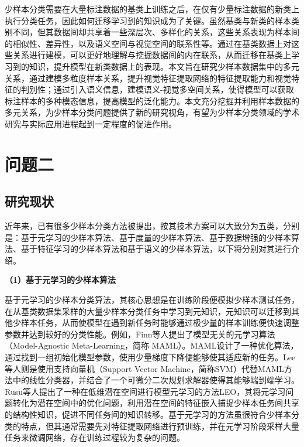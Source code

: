 少样本分类需要在大量标注数据的基类上训练之后，在仅有少量标注数据的新类上执行分类任务，因此如何迁移学习到的知识成为了关键。虽然基类与新类的样本类别不同，但其数据间却共享着一些深层次、多样化的关系，这些关系表现为样本间的相似性、差异性，以及语义空间与视觉空间的联系性等。通过在基类数据上对这些关系进行建模，可以更好地理解与挖掘数据间的内在联系，从而迁移在基类上学习到的知识，提升模型在新类数据上的表现。本文旨在研究少样本数据集中的多元关系，通过建模多粒度样本关系，提升视觉特征提取网络的特征提取能力和视觉特征的判别性；通过引入语义信息，建模语义-视觉多空间关系，使得模型可以获取标注样本的多种模态信息，提高模型的泛化能力。本文充分挖掘并利用样本数据的多元关系，为少样本分类问题提供了新的研究视角，有望为少样本分类领域的学术研究与实际应用进程起到一定程度的促进作用。


\section[\hspace{-2pt}问题二]{{\heiti{} \hspace{-8pt}问题二}}\label{section1: 问题二}

\subsection[\hspace{-2pt}研究现状]{{\heiti{} \hspace{-8pt}研究现状}}\label{section1: 研究现状}

近年来，已有很多少样本分类方法被提出，按其技术方案可以大致分为五类，分别是：基于元学习的少样本算法、基于度量的少样本算法、基于数据增强的少样本算法、基于特征学习的少样本算法和基于语义的少样本算法，以下将分别对其进行介绍。

\textbf{（1）基于元学习的少样本算法}

基于元学习的少样本分类算法\cite{MAML, lee2019meta, LEO, 元学习}，其核心思想是在训练阶段便模拟少样本测试任务，在从基类数据集采样的大量少样本分类任务中学习到元知识，元知识可以迁移到其他少样本任务，从而使模型在遇到新任务时能够通过极少量的样本训练便快速调整参数并达到较好的分类性能。例如，Finn等人\cite{MAML}提出了模型无关的元学习算法（Model-Agnostic Meta-Learning，简称 MAML）。MAML设计了一种优化算法，通过找到一组初始化模型参数，使用少量梯度下降便能够使其适应新的任务。Lee等人\cite{lee2019meta}则是使用支持向量机（Support Vector Machine，简称SVM）代替MAML方法中的线性分类器，并结合了一个可微分二次规划求解器使得其能够端到端学习。Rusu等人\cite{LEO}提出了一种在低维潜在空间进行模型元学习的方法LEO，其将元学习问题转化为潜在空间中的优化问题，利用潜在空间的特征嵌入捕捉少样本任务间共享的结构性知识，促进不同任务间的知识转移。基于元学习的方法虽很符合少样本分类的特点，但其通常需要先对特征提取网络进行预训练，并在元学习阶段采样大量任务来微调网络，存在训练过程较为复杂的问题。

